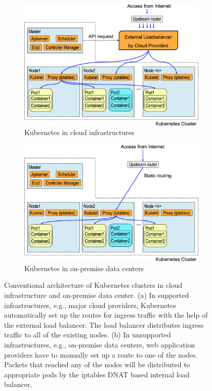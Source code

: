 \begin{figure}[tb]

  \begin{subfigure}[t]{\columnwidth}
    \centering
    \includegraphics[width=0.8\columnwidth]{Figs/K8sConventional}
    \caption{Kubernetes in cloud infrastructures}
    \label{fig:K8sConventional}
  \end{subfigure}

  \par\bigskip
  \par\bigskip

  \begin{subfigure}[t]{\columnwidth}
    \centering
    \includegraphics[width=0.8\columnwidth]{Figs/K8sConventional_bm}
    \caption{Kubernetes in on-premise data centers}
    \label{fig:K8sConventional_bm}
  \end{subfigure}

   \centering

  \begin{minipage}{1.0\columnwidth}
    \caption[Conventional architecture of Kubernetes clusters]
            {Conventional architecture of Kubernetes clusters in cloud infrastructure and on-premise data center.
(a) In supported infrastructures, e.g., major cloud providers, Kubernetes automatically set up the routes for ingress traffic with the help of the external load balancer.
The load balancer distributes ingress traffic to all of the existing nodes.
(b) In unsupported infrastructures, e.g., on-premise data centers, web application providers have to manually set up a route to one of the nodes.
Packets that reached any of the nodes will be distributed to appropriate pods by the iptables DNAT based internal load balancer.
            }
  \end{minipage}

\end{figure}


